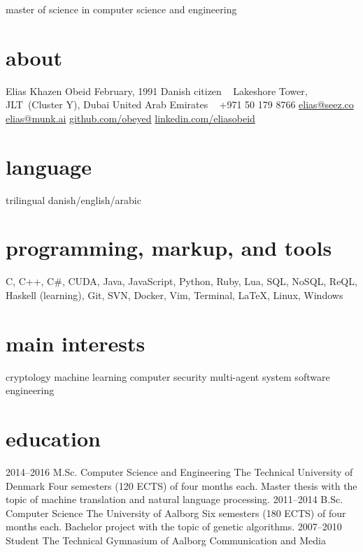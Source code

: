 \documentclass[]{friggeri-cv}
\begin{document}
    {master of science in computer science and engineering}

\begin{aside}
  \section{about}
    Elias Khazen Obeid
    February, 1991
    Danish citizen
    ~
    Lakeshore Tower, JLT~(Cluster Y), Dubai
    United Arab Emirates
    ~
    +971 50 179 8766
    \href{mailto:elias@seez.co}{elias@seez.co}
    \href{mailto:elias@munk.ai}{elias@munk.ai}
    \href{https://github.com/obeyed}{github.com/obeyed}
    \href{https://www.linkedin.com/in/eliasobeid}{linkedin.com/eliasobeid}
  \section{language}
    trilingual danish/english/arabic
  \section{programming, markup, and tools}
    C, C++, C\#, CUDA, Java, JavaScript, Python, Ruby, Lua, 
    SQL, NoSQL, ReQL, 
    Haskell (learning),
    Git, SVN, Docker, Vim, Terminal, \LaTeX{}, Linux, Windows
  \section{main interests}
    cryptology
    machine learning
    computer security
    multi-agent system
    software engineering
\end{aside}

\section{education}

\begin{entrylist}
  \entry
    {2014--2016}
    {M.Sc. {\normalfont Computer Science and Engineering}}
    {The Technical University of Denmark}
    {Four semesters (120 ECTS) of four months each.
	Master thesis with the topic of machine translation and natural language processing.}
  \entry
    {2011--2014}
    {B.Sc. {\normalfont Computer Science}}
    {The University of Aalborg}
    {Six semesters (180 ECTS) of four months each.
	Bachelor project with the topic of genetic algorithms.}
  \entry
    {2007--2010}
    {Student}
    {The Technical Gymnasium of Aalborg}
    {Communication and Media}
\end{entrylist}
\end{document}
